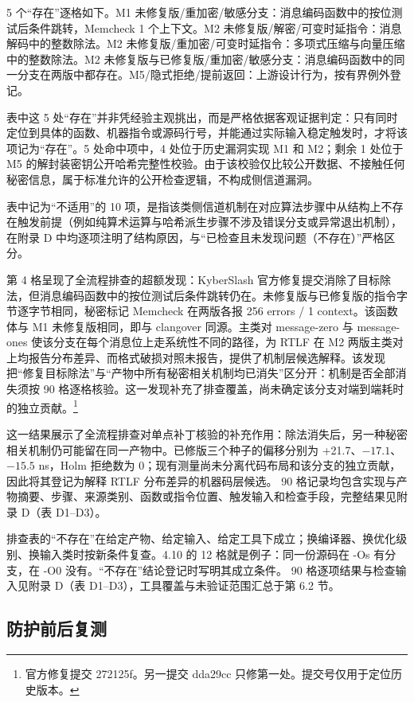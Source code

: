 5 个“存在”逐格如下。M1 未修复版/重加密/敏感分支：消息编码函数中的按位测试后条件跳转，Memcheck 1 个上下文。M2 未修复版/解密/可变时延指令：消息解码中的整数除法。M2 未修复版/重加密/可变时延指令：多项式压缩与向量压缩中的整数除法。M2 未修复版与已修复版/重加密/敏感分支：消息编码函数中的同一分支在两版中都存在。M5/隐式拒绝/提前返回：上游设计行为，按有界例外登记。%

表中这 5 处“存在”并非凭经验主观挑出，而是严格依据客观证据判定：只有同时定位到具体的函数、机器指令或源码行号，并能通过实际输入稳定触发时，才将该项记为“存在”。5 处命中项中，4 处位于历史漏洞实现 M1 和 M2；剩余 1 处位于 M5 的解封装密钥公开哈希完整性校验。由于该校验仅比较公开数据、不接触任何秘密信息，属于标准允许的公开检查逻辑，不构成侧信道漏洞。

表中记为“不适用”的 10 项，是指该类侧信道机制在对应算法步骤中从结构上不存在触发前提（例如纯算术运算与哈希派生步骤不涉及错误分支或异常退出机制），在附录 D 中均逐项注明了结构原因，与“已检查且未发现问题（不存在）”严格区分。%

第 4 格呈现了全流程排查的超额发现：KyberSlash 官方修复提交消除了目标除法，但消息编码函数中的按位测试后条件跳转仍在。未修复版与已修复版的指令字节逐字节相同，秘密标记 Memcheck 在两版各报 256 errors / 1 context。该函数体与 M1 未修复版相同，即与 clangover 同源。主类对 message-zero 与 message-ones 使该分支在每个消息位上走系统性不同的路径，为 RTLF 在 M2 两版主类对上均报告分布差异、而格式破损对照未报告，提供了机制层候选解释。该发现把“修复目标除法”与“产物中所有秘密相关机制均已消失”区分开：机制是否全部消失须按 90 格逐格核验。这一发现补充了排查覆盖，尚未确定该分支对端到端耗时的独立贡献。\footnote{官方修复提交 272125f。另一提交 dda29cc 只修第一处。提交号仅用于定位历史版本。} %

这一结果展示了全流程排查对单点补丁核验的补充作用：除法消失后，另一种秘密相关机制仍可能留在同一产物中。已修版三个种子的偏移分别为 +21.7、$-17.1$、$-15.5$ ns，Holm 拒绝数为 0；现有测量尚未分离代码布局和该分支的独立贡献，因此将其登记为解释 RTLF 分布差异的机器码层候选。%
90 格记录均包含实现与产物摘要、步骤、来源类别、函数或指令位置、触发输入和检查手段，完整结果见附录 D（表 D1--D3）。

排查表的“不存在”在给定产物、给定输入、给定工具下成立；换编译器、换优化级别、换输入类时按新条件复查。4.10 的 12 格就是例子：同一份源码在 -Os 有分支，在 -O0 没有。“不存在”结论登记时写明其成立条件。
90 格逐项结果与检查输入见附录 D（表 D1--D3），工具覆盖与未验证范围汇总于第 6.2 节。

\subsection{防护前后复测}

